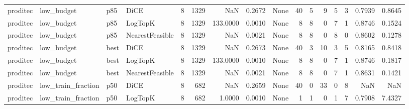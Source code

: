 \begin{tabular}{llllrrrrlrrrrrrr}
proditec &           low\_budget &    p85 &            DiCE &            8 &                 1329 &                      NaN &      0.2672 &                                               None &     40 &            5 &        9 &              5 &          3 &             0.7939 &         0.8645 \\
proditec &           low\_budget &    p85 &         LogTopK &            8 &                 1329 &                 133.0000 &      0.0010 &                                               None &      8 &            8 &        0 &              7 &          1 &             0.8746 &         0.1524 \\
proditec &           low\_budget &    p85 & NearestFeasible &            8 &                 1329 &                      NaN &      0.0021 &                                               None &      8 &            8 &        0 &              8 &          0 &             0.8602 &         0.1278 \\
proditec &           low\_budget &   best &            DiCE &            8 &                 1329 &                      NaN &      0.2673 &                                               None &     40 &            3 &       10 &              3 &          5 &             0.8165 &         0.8418 \\
proditec &           low\_budget &   best &         LogTopK &            8 &                 1329 &                 133.0000 &      0.0010 &                                               None &      8 &            8 &        0 &              7 &          1 &             0.8746 &         0.1817 \\
proditec &           low\_budget &   best & NearestFeasible &            8 &                 1329 &                      NaN &      0.0021 &                                               None &      8 &            8 &        0 &              7 &          1 &             0.8631 &         0.1421 \\
proditec &   low\_train\_fraction &    p50 &            DiCE &            8 &                  682 &                      NaN &      0.2659 &                                               None &     40 &            0 &       33 &              0 &          8 &                NaN &            NaN \\
proditec &   low\_train\_fraction &    p50 &         LogTopK &            8 &                  682 &                   1.0000 &      0.0010 &                                               None &      1 &            1 &        0 &              1 &          7 &             0.7908 &         7.4327 \\

\end{tabular}
